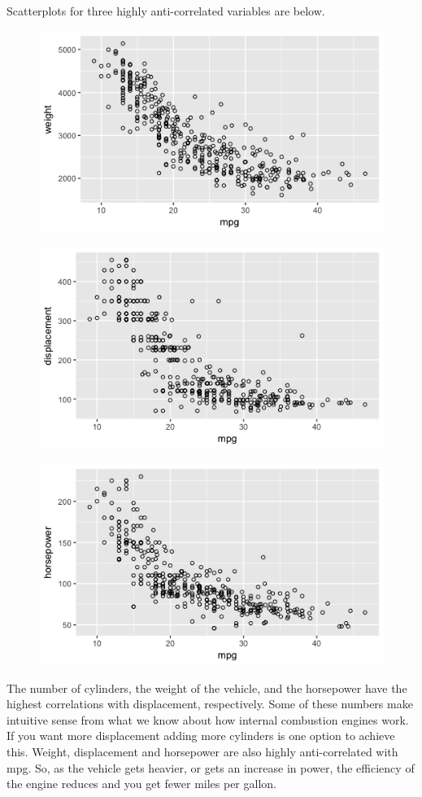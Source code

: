\begin{enumerate}
\begin{figure}[htbp]
	\end{figure}
	\newpage
	Scatterplots for three highly anti-correlated variables are below.
	\begin{figure}[htbp]
		\centering
		\includegraphics[width=.8\linewidth]{img/ESL_02_weight_vs_mpg.png}
	\end{figure}
	\begin{figure}[htbp]
		\centering
		\includegraphics[width=.8\linewidth]{img/ESL_02_disp_vs_mpg.png}
	\end{figure}
	\begin{figure}[htbp]
		\centering
		\includegraphics[width=.8\linewidth]{img/ESL_02_hrsp_mpg.png}
	\end{figure}
	\newpage
	The number of cylinders, the weight of the vehicle, and the horsepower have the highest correlations with displacement, respectively. Some of these numbers make intuitive sense from what we know about how internal combustion engines work. If you want more displacement adding more cylinders is one option to achieve this. Weight, displacement and horsepower are also highly anti-correlated with mpg. So, as the vehicle gets heavier, or gets an increase in power, the efficiency of the engine reduces and you get fewer miles per gallon.

\end{enumerate}
